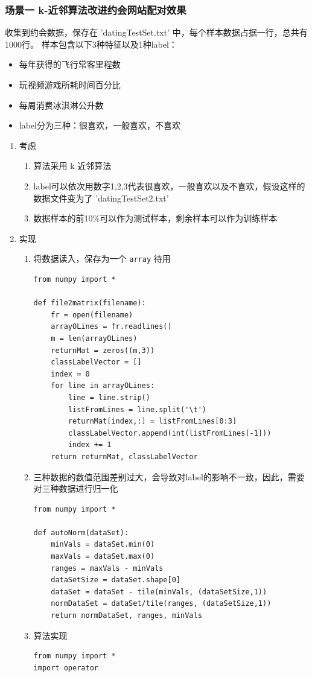 \documentclass[11pt]{ctexart}
\begin{document}
\subsubsection{场景一 k-近邻算法改进约会网站配对效果}
\label{sec:orgheadline5}
收集到约会数据，保存在 'datingTestSet.txt' 中，每个样本数据占据一行，总共有1000行。
样本包含以下3种特征以及1种label：
\begin{itemize}
\item 每年获得的飞行常客里程数
\item 玩视频游戏所耗时间百分比
\item 每周消费冰淇淋公升数
\item label分为三种：很喜欢，一般喜欢，不喜欢
\end{itemize}
\begin{enumerate}
\item 考虑
\label{sec:orgheadline3}
\begin{enumerate}
\item 算法采用 k 近邻算法
\item label可以依次用数字1,2,3代表很喜欢，一般喜欢以及不喜欢，假设这样的数据文件变为了
'datingTestSet2.txt'
\item 数据样本的前10\%可以作为测试样本，剩余样本可以作为训练样本
\end{enumerate}
\item 实现
\label{sec:orgheadline4}
\begin{enumerate}
\item 将数据读入，保存为一个 \texttt{array} 待用
\lstset{language=Python,label= ,caption= ,captionpos=b,numbers=none}
\begin{lstlisting}
from numpy import *

def file2matrix(filename):
    fr = open(filename)
    arrayOLines = fr.readlines()
    m = len(arrayOLines)
    returnMat = zeros((m,3))
    classLabelVector = []
    index = 0
    for line in arrayOLines:
        line = line.strip()
        listFromLines = line.split('\t')
        returnMat[index,:] = listFromLines[0:3]
        classLabelVector.append(int(listFromLines[-1]))
        index += 1
    return returnMat, classLabelVector
\end{lstlisting}
\item 三种数据的数值范围差别过大，会导致对label的影响不一致，因此，需要对三种数据进行归一化
\lstset{language=Python,label= ,caption= ,captionpos=b,numbers=none}
\begin{lstlisting}
from numpy import *

def autoNorm(dataSet):
    minVals = dataSet.min(0)
    maxVals = dataSet.max(0)
    ranges = maxVals - minVals
    dataSetSize = dataSet.shape[0]
    dataSet = dataSet - tile(minVals, (dataSetSize,1))
    normDataSet = dataSet/tile(ranges, (dataSetSize,1))
    return normDataSet, ranges, minVals
\end{lstlisting}
\item 算法实现
\lstset{language=Python,label= ,caption= ,captionpos=b,numbers=none}
\begin{lstlisting}
from numpy import *
import operator


\end{lstlisting}
\end{enumerate}
\end{enumerate}
\end{document}
